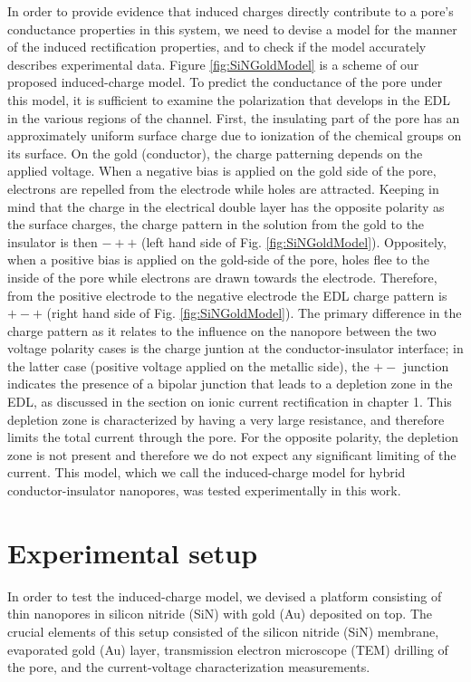 		
		In order to provide evidence that induced charges directly contribute to a pore's conductance properties in this system, we need to devise a model for the manner of the induced rectification properties, and to check if the model accurately describes experimental data. Figure \ref{fig:SiNGoldModel} is a scheme of our proposed induced-charge model. To predict the conductance of the pore under this model, it is sufficient to examine the polarization that develops in the EDL in the various regions of the channel. First, the insulating part of the pore has an approximately uniform surface charge due to ionization of the chemical groups on its surface. On the gold (conductor), the charge patterning depends on the applied voltage. When a negative bias is applied on the gold side of the pore, electrons are repelled from the electrode while holes are attracted. Keeping in mind that the charge in the electrical double layer has the opposite polarity as the surface charges, the charge pattern in the solution from the gold to the insulator is then $-++$ (left hand side of Fig. \ref{fig:SiNGoldModel}). Oppositely, when a positive bias is applied on the gold-side of the pore, holes flee to the inside of the pore while electrons are drawn towards the electrode. Therefore, from the positive electrode to the negative electrode the EDL charge pattern is $+-+$ (right hand side of Fig. \ref{fig:SiNGoldModel}). The primary difference in the charge pattern as it relates to the influence on the nanopore between the two voltage polarity cases is the charge juntion at the conductor-insulator interface; in the latter case (positive voltage applied on the metallic side), the $+-$ junction indicates the presence of a bipolar junction that leads to a depletion zone in the EDL, as discussed in the section on ionic current rectification in chapter 1. This depletion zone is characterized by having a very large resistance, and therefore limits the total current through the pore. For the opposite polarity, the depletion zone is not present and therefore we do not expect any significant limiting of the current. This model, which we call the induced-charge model for hybrid conductor-insulator nanopores, was tested experimentally in this work.
		
	\section{Experimental setup}
		
		In order to test the induced-charge model, we devised a platform consisting of thin nanopores in silicon nitride (SiN) with gold (Au) deposited on top. The crucial elements of this setup consisted of the silicon nitride (SiN) membrane, evaporated gold (Au) layer, transmission electron microscope (TEM) drilling of the pore, and the current-voltage characterization measurements.
		
